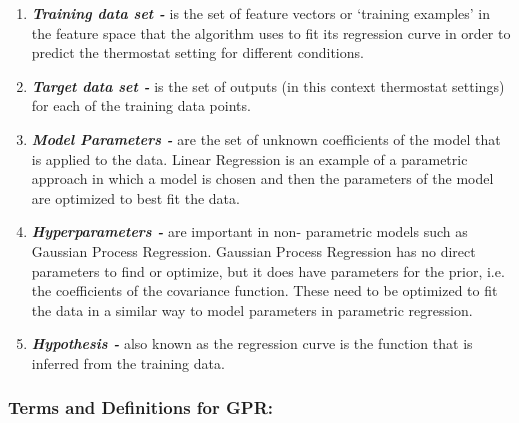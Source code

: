 \documentclass[10.5pt,a4paper,twoside]{report}   %
\begin{document}
\begin{enumerate}
\item  \textbf{\textit{Training data set - }}is the set of feature vectors or `training examples' in the feature space that the algorithm uses to fit its regression curve in order to predict the thermostat setting for different conditions.

\item  \textbf{\textit{Target data set -} }is the set of outputs (in this context thermostat settings) for each of the training data points. 

\item  \textbf{\textit{Model Parameters - }}are the set of unknown coefficients of the model that is applied to the data. Linear Regression is an example of a parametric approach in which a model is chosen and then the parameters of the model are optimized to best fit the data. 

\item  \textbf{\textit{Hyperparameters - }}are important in non- parametric models such as Gaussian Process Regression. Gaussian Process Regression has no direct parameters to find or optimize, but it does have parameters for the prior, i.e. the coefficients of the covariance function. These need to be optimized to fit the data in a similar way to model parameters in parametric regression. 

\item  \textbf{\textit{Hypothesis - }}also known as the regression curve is the function that is inferred from the training data.
\end{enumerate}


\subsubsection{Terms and Definitions for GPR:}
\end{document}

